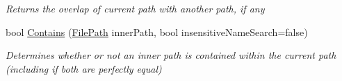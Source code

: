 \begin{DoxyCompactItemize}
\begin{DoxyCompactList}\small\item\em Returns the overlap of current path with another path, if any \end{DoxyCompactList}\item 
bool \hyperlink{class_cloud_api_public_1_1_model_1_1_file_path_a130748c71b8f0258ef9031d32f9e8ff6}{Contains} (\hyperlink{class_cloud_api_public_1_1_model_1_1_file_path}{File\-Path} inner\-Path, bool insensitive\-Name\-Search=false)
\begin{DoxyCompactList}\small\item\em Determines whether or not an inner path is contained within the current path (including if both are perfectly equal) \end{DoxyCompactList}\end{DoxyCompactItemize}
